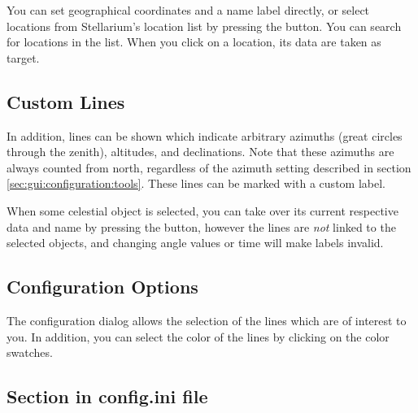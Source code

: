 \noindent You can set  geographical coordinates and a name
label directly, or select locations from Stellarium's location list by
pressing the  button.  You can search for locations in the
list. When you click on a location, its data are taken as target.

\subsection{Custom Lines}
\label{sec:plugin:ArchaeoLines:Custom}

In addition, lines can be shown which indicate arbitrary azimuths (great circles through the zenith),
altitudes, and declinations.   Note that these azimuths are always counted
from north, regardless of the azimuth setting described in section
\ref{sec:gui:configuration:tools}. These lines can be marked with a custom label.

When some celestial object is selected, you can take over its current
respective data and name by pressing the
 button, however the lines
are \emph{not} linked to the selected objects, and changing angle
values or time will make labels invalid.

\subsection{Configuration Options}
\label{sec:plugin:ArchaeoLines:configuration}

The configuration dialog allows the selection of the lines which are
of interest to you. 
%
%
In addition, you can select the color of the lines by clicking on the
color swatches.

\subsection*{Section  in config.ini file}


